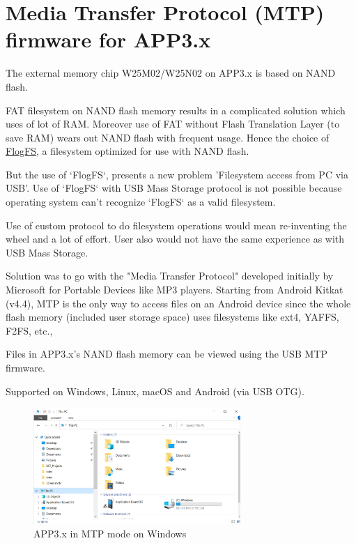 \documentclass[11pt,headings=small]{scrartcl}
\begin{document}
\newpage
\section{Media Transfer Protocol (MTP) firmware for APP3.x}

The external memory chip W25M02/W25N02 on APP3.x is based on NAND flash.

FAT filesystem on NAND flash memory results in a complicated solution which uses of lot of RAM. Moreover use of FAT without Flash Translation Layer (to save RAM) wears out NAND flash with frequent usage. Hence the choice of \href{https://github.com/conservify/FLogFS}{FlogFS}, a filesystem optimized for use with NAND flash.

But the use of `FlogFS`, presents a new problem 'Filesystem access from PC via USB'. Use of `FlogFS` with USB Mass Storage protocol is not possible because operating system can't recognize `FlogFS` as a valid filesystem.

Use of custom protocol to do filesystem operations would mean re-inventing the wheel and a lot of effort. User also would not have the same experience as with USB Mass Storage.

Solution was to go with the "Media Transfer Protocol" developed initially by Microsoft for Portable Devices like MP3 players. Starting from Android Kitkat (v4.4), MTP is the only way to access files on an Android device since the whole flash memory (included user storage space) uses filesystems like ext4, YAFFS, F2FS, etc.,

Files in APP3.x's NAND flash memory can be viewed using the USB MTP firmware.

Supported on Windows, Linux, macOS and Android (via USB OTG).

\begin{figure}[H]
	\begin{center}
		\includegraphics[width=0.7\textwidth]{coinesAPI_images/MTP_windows.png}
		\caption{APP3.x in MTP mode on Windows}
	\end{center}
\end{figure}
\end{document}
